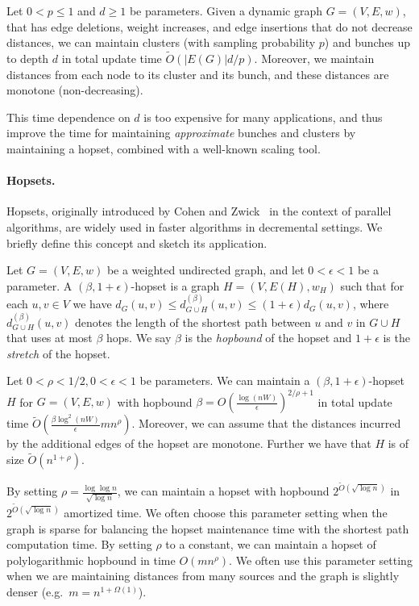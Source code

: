\begin{lemma}[\cite{RZ12}]\label{lem:rz}
Let $0<p\leq 1$ and $d\geq 1$ be parameters. Given a dynamic graph $G=(V,E,w)$, that has edge deletions, weight increases, and edge insertions that do not decrease distances, we can maintain clusters (with sampling probability $p$) and bunches up to depth $d$ in total update time $\tilde O(|E(G)|d/p)$. Moreover, we maintain distances from each node to its cluster and its bunch, and these distances are monotone (non-decreasing).
\end{lemma}

This time dependence on $d$ is too expensive for many applications, and thus \cite{LN2020} improve the time for maintaining \textit{approximate} bunches and clusters by maintaining a hopset, combined with a well-known scaling tool. 

\paragraph{Hopsets.}
Hopsets, originally introduced by Cohen and Zwick~\cite{CohenZ01} in the context of parallel algorithms, are widely used in faster algorithms in decremental settings. We briefly define this concept and sketch its application. 
\begin{definition}
Let $G=(V,E,w)$ be a weighted undirected graph, and let $0<\epsilon <1$ be a parameter. A $(\beta,1+\epsilon)$-hopset is a graph $H=(V,E(H),w_H)$ such that for each $u,v\in V$ we have $d_G(u,v)\leq d^{(\beta)}_{G\cup H}(u,v) \leq (1+\epsilon) d_G(u,v)$, where $d^{(\beta)}_{G\cup H}(u,v)$ denotes the length of the shortest path between $u$ and $v$ in $G\cup H$ that uses at most $\beta$ hops. We say $\beta$ is the \emph{hopbound} of the hopset and $1+\epsilon$ is the \emph{stretch} of the hopset. 
\end{definition}


\begin{theorem}[\cite{LN2020}] \label{thm:hopset}
Let $0 < \rho < 1/2, 0< \epsilon <1$ be parameters. We can maintain a $(\beta,1+\epsilon)$-hopset $H$ for $G=(V,E,w)$ with hopbound $\beta =  O(\tfrac{\log(nW)}{\epsilon})^{2/\rho+1}$ in total update time $\tilde O (\tfrac{\beta\log^2(nW)}{\epsilon}mn^{\rho})$. Moreover, we can assume that the distances incurred by the additional edges of the hopset are monotone. Further we have that $H$ is of size $\tilde O(n^{1+\rho})$. 
\end{theorem}

By setting $\rho=\frac{\log \log n}{\sqrt{\log n}}$, we can maintain a hopset with hopbound $2^{\tilde{O}(\sqrt{\log n})}$ in $2^{\tilde{O}(\sqrt{\log n})}$ amortized time. We often choose this parameter setting when the graph is sparse for balancing the hopset maintenance time with the shortest path computation time.
By setting $\rho$ to a constant, we can maintain a hopset of polylogarithmic hopbound in time $O(mn^{\rho})$. We often use this parameter setting when we are maintaining distances from many sources and the graph is slightly denser (e.g.~$m=n^{1+\Omega(1)}$).

